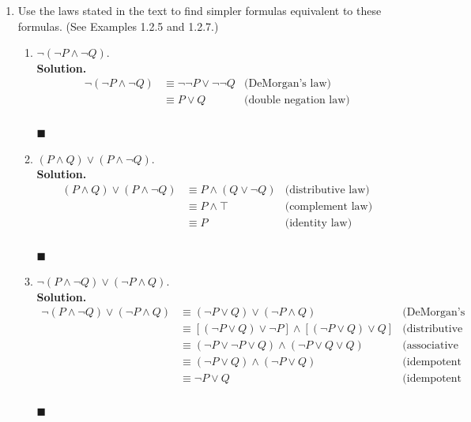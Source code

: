 \documentclass{report}
\newcommand{\sol}{\vspace{1em}\\\textbf{Solution.}\vspace{0.5em}}
\newcommand{\qed}{‎\\‎\hfill$\blacksquare$\vspace{1em}}
\begin{document}
\begin{enumerate}[leftmargin=*]
\begin{enumerate}
          \end{enumerate}
    \item Use the laws stated in the text to find simpler formulas equivalent to these
          formulas. (See Examples 1.2.5 and 1.2.7.)
          \begin{enumerate}
              \item $\neg(\neg P \wedge \neg Q)$.
                    \sol{}
                    \begin{align*}
                        \neg(\neg P \wedge \neg Q) & \equiv \neg\neg P \vee \neg\neg Q & \text{(DeMorgan's law)}      \\
                                                   & \equiv P \vee Q                   & \text{(double negation law)}
                    \end{align*} \qed

              \item $(P \wedge Q) \vee(P \wedge \neg Q)$.
                    \sol{}
                    \begin{align*}
                        (P \wedge Q) \vee(P \wedge \neg Q) & \equiv P \wedge (Q \vee \neg Q) & \text{(distributive law)} \\
                                                           & \equiv P \wedge \top            & \text{(complement law)}   \\
                                                           & \equiv P                        & \text{(identity law)}
                    \end{align*} \qed

              \item $\neg(P \wedge \neg Q) \vee(\neg P \wedge Q)$.
                    \sol{}
                    \begin{align*}
                        \neg(P \wedge \neg Q) \vee(\neg P \wedge Q) & \equiv (\neg P \vee Q) \vee(\neg P \wedge Q)                         & \text{(DeMorgan's law)}   \\
                                                                    & \equiv [(\neg P \vee Q) \vee \neg P] \wedge [(\neg P \vee Q) \vee Q] & \text{(distributive law)} \\
                                                                    & \equiv (\neg P \vee \neg P \vee Q) \wedge (\neg P \vee Q \vee Q)     & \text{(associative law)}  \\
                                                                    & \equiv (\neg P \vee Q) \wedge (\neg P \vee Q)                        & \text{(idempotent law)}   \\
                                                                    & \equiv \neg P \vee Q                                                 & \text{(idempotent law)}
                    \end{align*} \qed
          \end{enumerate}


\end{enumerate}
\end{document}
